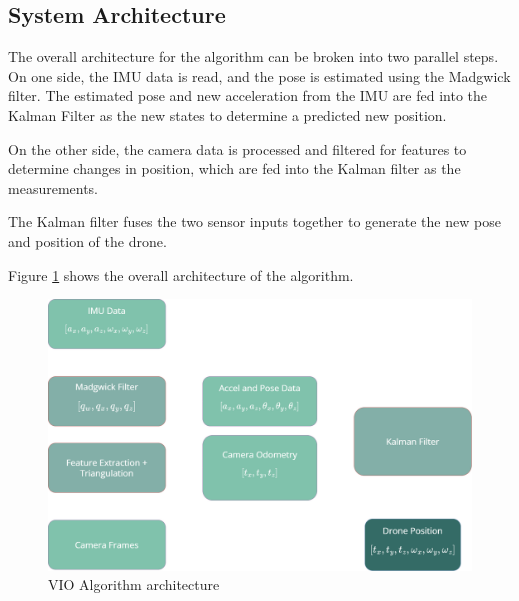 \documentclass[bare_jrnl_transmag]{subfiles}
\begin{document}
\subsection{System Architecture}

The overall architecture for the algorithm can be broken into two parallel steps. On one side, the IMU data is read, and the pose is estimated using the Madgwick filter. The estimated pose and new acceleration from the IMU are fed into the Kalman Filter as the new states to determine a predicted new position. 

On the other side, the camera data is processed and filtered for features to determine changes in position, which are fed into the Kalman filter as the measurements.

The Kalman filter fuses the two sensor inputs together to generate the new pose and position of the drone. 

Figure \ref{fig:vio-arch} shows the overall architecture of the algorithm. 

\begin{figure}
    [H]
    \centering
    \includegraphics[width=0.8\linewidth]{figures/VIO-arch.png}
    \caption{VIO Algorithm architecture}
    \label{fig:vio-arch}
\end{figure}
\end{document}
